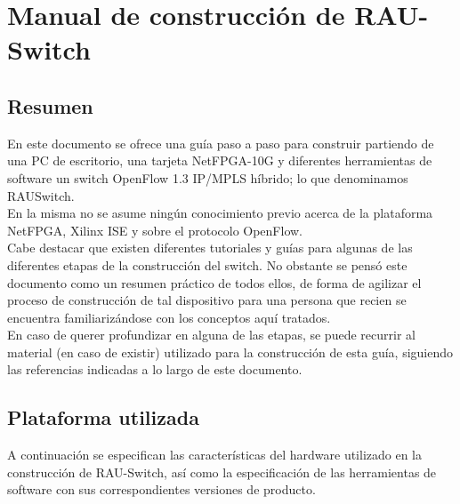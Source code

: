 
\chapter{Manual de construcción de RAU-Switch}

\ifpdf
    \graphicspath{{Anexo1/Figs/Raster/}{Anexo1/Figs/PDF/}{Anexo1/Figs/}}
\else
    \graphicspath{{Anexo1/Figs/Vector/}{Anexo1/Figs/}}
\fi



\section{Resumen}

En este documento se ofrece una guía paso a paso para construir partiendo de una PC de escritorio, una tarjeta NetFPGA-10G y diferentes herramientas de software un switch OpenFlow 1.3 IP/MPLS híbrido; lo que denominamos RAUSwitch.\\

En la misma no se asume ningún conocimiento previo acerca de la plataforma NetFPGA, Xilinx ISE y sobre el protocolo OpenFlow.\\

Cabe destacar que existen diferentes tutoriales y guías para algunas de las diferentes etapas de la construcción del switch. No obstante se pensó este documento como un resumen práctico de todos ellos, de forma de agilizar el proceso de construcción de tal dispositivo para una persona que recien se encuentra familiarizándose con los conceptos aquí tratados.\\

En caso de querer profundizar en alguna de las etapas, se puede recurrir al material (en caso de existir) utilizado para la construcci\'on de esta gu\'ia, siguiendo las referencias indicadas a lo largo de este documento.


\section{Plataforma utilizada}
\label{annexI.1}
A continuación se especifican las caracter\'isticas del hardware utilizado en la construcci\'on de RAU-Switch, as\'i como la especificaci\'on de las herramientas de software con sus correspondientes versiones de producto.
 
